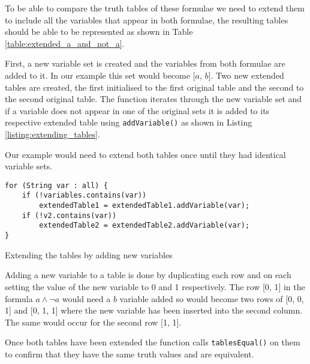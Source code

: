 \documentclass{report}
\begin{document}
To be able to compare the truth tables of these formulae we need to extend them to include all the variables that appear in both formulae, the resulting tables should be able to be represented as shown in Table \ref{table:extended_a_and_not_a}.


First, a new variable set is created and the variables from both formulae are added to it. In our example this set would become [$a$, $b$]. Two new extended tables are created, the first initialised to the first original table and the second to the second original table. The function iterates through the new variable set and if a variable does not appear in one of the original sets it is added to its respective extended table using {\tt addVariable()} as shown in Listing \ref{listing:extending_tables}. 

Our example would need to extend both tables once until they had identical variable sets.

\begin{listing}[ht]
\begin{verbatim} 
for (String var : all) {
    if (!variables.contains(var))
        extendedTable1 = extendedTable1.addVariable(var);
    if (!v2.contains(var))
        extendedTable2 = extendedTable2.addVariable(var);
}
\end{verbatim}
\caption{Extending the tables by adding new variables}
\label{listing:extending_tables}
\end{listing}

Adding a new variable to a table is done by duplicating each row and on each setting the value of the new variable to 0 and 1 respectively. The row [0, 1] in the formula $a\land\lnot a$ would need a $b$ variable added so would become two rows of [0, 0, 1] and [0, 1, 1] where the new variable has been inserted into the second column. The same would occur for the second row [1, 1].

Once both tables have been extended the function calls {\tt tablesEqual()} on them to confirm that they have the same truth values and are equivalent.
\end{document}
